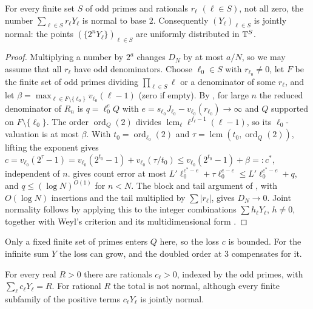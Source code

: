 \documentclass[11pt]{article}
\newcommand{\fr}[1]{\{#1\}}
\DeclareMathOperator{\ord}{ord}
\DeclareMathOperator{\lcm}{lcm}
\begin{document}
\begin{theorem}\label{thm:combos}
For every finite set $S$ of odd primes and rationals $r_\ell$ $(\ell\in S)$, not all zero, the number
$\sum_{\ell\in S}r_\ell Y_\ell$ is normal to base $2$. Consequently $(Y_\ell)_{\ell\in S}$ is jointly
normal: the points $(\fr{2^nY_\ell})_{\ell\in S}$ are uniformly distributed in $\mathbb T^S$.
\end{theorem}

\begin{proof}
Multiplying a number by $2^a$ changes $D_N$ by at most $a/N$, so we may assume that all $r_\ell$ have odd
denominators. Choose $\ell_0\in S$ with $r_{\ell_0}\ne0$, let $F$ be the finite set of odd primes dividing
$\prod_{\ell\in S}\ell$ or a denominator of some $r_\ell$, and let
$\beta=\max_{\ell\in F\setminus\{\ell_0\}}v_{\ell_0}(\ell-1)$ (zero if empty). By , for large
$n$ the reduced denominator of $R_n$ is $q=\ell_0^eQ$ with $e=s_{\ell_0}J_{\ell_0}-v_{\ell_0}(r_{\ell_0})\to\infty$
and $Q$ supported on $F\setminus\{\ell_0\}$. The order $\ord_Q(2)$ divides $\lcm_\ell\ell^{f_\ell-1}(\ell-1)$,
so its $\ell_0$-valuation is at most $\beta$. With $t_0=\ord_{\ell_0}(2)$ and $\tau=\lcm(t_0,\ord_Q(2))$,
lifting the exponent gives $c=v_{\ell_0}(2^\tau-1)=v_{\ell_0}(2^{t_0}-1)+v_{\ell_0}(\tau/t_0)\le
v_{\ell_0}(2^{t_0}-1)+\beta=:c^*$, independent of $n$.  gives count error at most
$L'\ell_0^{c^*-e}+\tau\ell_0^{e-c}\le L'\ell_0^{c^*-e}+q$, and $q\le(\log N)^{O(1)}$ for $n<N$. The block and tail
argument of , with $O(\log N)$ insertions and the tail multiplied by $\sum|r_\ell|$, gives
$D_N\to0$. Joint normality follows by applying this to the integer combinations $\sum h_\ell Y_\ell$,
$h\ne0$, together with Weyl's criterion and its multidimensional form
\cite[Chapter~1, Theorems~2.1 and~6.2, pp.~7 and~49]{KN}.
\end{proof}

Only a fixed finite set of primes enters $Q$ here, so the loss $c$ is bounded. For the infinite sum
$Y$ the loss can grow, and the doubled order at $3$ compensates for it.

\begin{theorem}\label{thm:rationaltotal}
For every real $R>0$ there are rationals $c_\ell>0$, indexed by the odd primes, with
$\sum_\ell c_\ell Y_\ell=R$. For rational $R$ the total is not normal, although every finite subfamily
of the positive terms $c_\ell Y_\ell$ is jointly normal.
\end{theorem}
\end{document}
